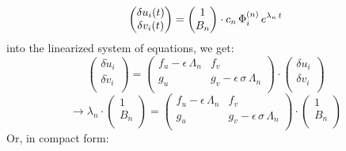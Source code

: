 {\begin{equation*}
    \begin{pmatrix}
    \delta u_i (t) \\
    \delta v_i (t) \\
    \end{pmatrix}
    =
    \begin{pmatrix}
        1 \\
        B_n \\
    \end{pmatrix}
    \cdot  c_n\,\Phi_i^{(n)}\, e^{\lambda_n\,t} \\
\end{equation*}
into the linearized system of equations, we get:
\begin{equation*}
    \begin{pmatrix}
        \delta \dot{u}_i \\
        \delta \dot{v}_i \\
    \end{pmatrix}
    =
    \begin{pmatrix}
        f_u - \epsilon\,\Lambda_n & f_v \\
        g_u & g_v -\epsilon\,\sigma\,\Lambda_n \\
    \end{pmatrix}
    \cdot 
        \begin{pmatrix}
        \delta u_i \\
        \delta v_i \\
    \end{pmatrix}
\end{equation*}
\begin{equation*}
    \rightarrow
        \lambda_n \cdot
        \begin{pmatrix}
        1 \\
        B_n\\
    \end{pmatrix}
    =
    \begin{pmatrix}
        f_u - \epsilon\,\Lambda_n & f_v \\
        g_u & g_v -\epsilon\,\sigma\,\Lambda_n \\
    \end{pmatrix}
    \cdot 
        \begin{pmatrix}
        1 \\
        B_n\\
    \end{pmatrix}
\end{equation*}
Or, in compact form:
\begin{equation}

\end{equation}}
